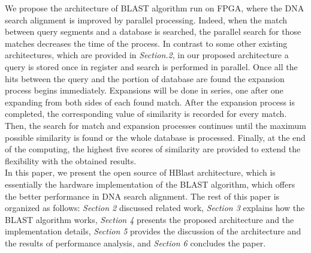 We propose the architecture of BLAST algorithm run on FPGA, where the DNA search alignment is improved by parallel processing. Indeed, when the match between query segments and a database is searched, the parallel search for those matches decreases the time of the process. In contrast to some other existing architectures, which are provided in \textit{Section.2}, in our proposed architecture a query is stored once in register and search is performed in parallel. Once all the hits between the query and the portion of database are found the expansion process begins immediately. Expansions will be done in series, one after one expanding from both sides of each found match. After the expansion process is completed, the corresponding value of similarity is recorded for every match. Then, the search for match and expansion processes continues until the maximum possible similarity is found or the whole database is processed. Finally, at the end of the computing, the highest five scores of similarity are provided to extend the flexibility with the obtained results. 
\\

In this paper, we present the open source of HBlast architecture, which is essentially the hardware implementation of the BLAST algorithm, which offers the better performance in DNA search alignment. The rest of this paper is organized as follows: \textit{Section 2} discussed related work, \textit{}\textit{Section 3} explains how the BLAST algorithm works, \textit{Section 4} presents the proposed architecture and the implementation details, \textit{Section 5} provides the discussion of the architecture and the results of performance analysis, and \textit{Section 6} concludes the paper.

 
 

 
 


